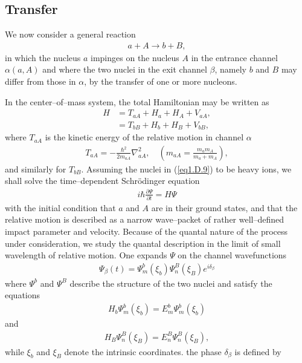 \begin{subappendices}
\subsection{Transfer}
We now consider a general reaction
\begin{align}\label{eq1.D.9}
a+A\rightarrow b+B,
\end{align}
in which the nucleus $a$ impinges on the nucleus $A$ in the entrance channel $\alpha(a,A)$ and where the two nuclei in the exit channel $\beta$, namely $b$ and $B$ may differ from those in $\alpha$, by the transfer of one or more nucleons.




In the center--of--mass system, the total Hamiltonian may be written as 
\begin{align}\label{eq1.D.10}
\nonumber H&=T_{aA}+H_a+H_A+V_{aA},\\
&=T_{bB}+H_b+H_B+V_{bB},
\end{align}
where $T_{aA}$ is the kinetic energy of the relative motion in channel $\alpha$
\begin{align}\label{eq1.D.11}
T_{aA}=-\frac{\hbar^2}{2m_{aA}}\nabla^2_{aA},\quad (m_{aA}=\frac{m_am_A}{m_a+m_A}),
\end{align}
and similarly for $T_{bB}$. Assuming the nuclei in (\ref{eq1.D.9}) to be heavy ions, we shall solve the time--dependent Schr\"odinger equation
\begin{align}\label{eq1.D.12}
i\hbar\frac{\partial\Psi}{\partial t}=H\Psi
\end{align}
with the initial condition that $a$ and $A$ are in their ground states, and that the relative motion is described as a narrow wave--packet of rather well--defined impact parameter and velocity. Because of the quantal nature of the process under consideration, we study the quantal description in the limit of small wavelength of relative motion. One expands $\Psi$ on the channel wavefunctions
\begin{align}\label{eq1.D.13}
\Psi_\beta(t)=\Psi_m^b(\xi_b)\Psi_n^B(\xi_B)e^{i\delta_\beta}
\end{align}
where $\Psi^b$ and $\Psi^B$ describe the structure of the two nuclei and satisfy the equations 
\begin{align}\label{eq1.D.14}
H_b\Psi_m^b(\xi_b)=E_m^b\Psi_m^b(\xi_b)
\end{align}
and
\begin{align}\label{eq1.D.15}
H_B\Psi_n^B(\xi_B)=E_n^B\Psi_n^B(\xi_B),
\end{align}
while $\xi_b$ and $\xi_B$ denote the intrinsic coordinates. the phase $\delta_\beta$ is defined by

\end{subappendices}
